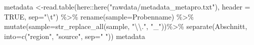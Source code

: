 \documentclass[
  letterpaper,
  DIV=11,
  numbers=noendperiod]{scrartcl}
\newenvironment{Shaded}{\begin{snugshade}}{\end{snugshade}}
\newcommand{\AttributeTok}[1]{\textcolor[rgb]{0.40,0.45,0.13}{#1}}
\newcommand{\ConstantTok}[1]{\textcolor[rgb]{0.56,0.35,0.01}{#1}}
\newcommand{\FunctionTok}[1]{\textcolor[rgb]{0.28,0.35,0.67}{#1}}
\newcommand{\NormalTok}[1]{\textcolor[rgb]{0.00,0.23,0.31}{#1}}
\newcommand{\OtherTok}[1]{\textcolor[rgb]{0.00,0.23,0.31}{#1}}
\newcommand{\SpecialCharTok}[1]{\textcolor[rgb]{0.37,0.37,0.37}{#1}}
\newcommand{\StringTok}[1]{\textcolor[rgb]{0.13,0.47,0.30}{#1}}
\begin{document}
\begin{Shaded}
\begin{Highlighting}[]
\NormalTok{metadata }\OtherTok{\textless{}{-}}\FunctionTok{read.table}\NormalTok{(here}\SpecialCharTok{::}\FunctionTok{here}\NormalTok{(}\StringTok{"rawdata/metadata\_metapro.txt"}\NormalTok{),}
           \AttributeTok{header =} \ConstantTok{TRUE}\NormalTok{,}
           \AttributeTok{sep=}\StringTok{"}\SpecialCharTok{\textbackslash{}t}\StringTok{"}\NormalTok{) }\SpecialCharTok{\%\textgreater{}\%}
  \FunctionTok{rename}\NormalTok{(}\AttributeTok{sample=}\NormalTok{Probenname) }\SpecialCharTok{\%\textgreater{}\%}
  \FunctionTok{mutate}\NormalTok{(}\AttributeTok{sample=}\FunctionTok{str\_replace\_all}\NormalTok{(sample, }\StringTok{"}\SpecialCharTok{\textbackslash{}\textbackslash{}}\StringTok{."}\NormalTok{, }\StringTok{"\_"}\NormalTok{))}\SpecialCharTok{\%\textgreater{}\%}
  \FunctionTok{separate}\NormalTok{(Abschnitt,}
           \AttributeTok{into=}\FunctionTok{c}\NormalTok{(}\StringTok{"region"}\NormalTok{, }\StringTok{"source"}\NormalTok{,}
           \AttributeTok{sep=}\StringTok{" "}\NormalTok{))}
\NormalTok{ metadata}
\end{Highlighting}
\end{Shaded}
\end{document}
